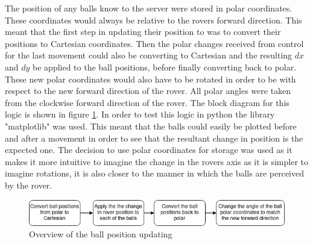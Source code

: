 \documentclass[10pt,twoside]{article}
\begin{document}
The position of any balls know to the server were stored in polar coordinates. These coordinates would always be relative to the rovers forward direction. This meant that the first step in updating their position to was to convert their positions to Cartesian coordinates. Then the polar changes received from control for the last movement could also be converting to Cartesian and the resulting $dx$ and $dy$ be applied to the ball positions, before finally converting back to polar. These new polar coordinates would also have to be rotated in order to be with respect to the new forward direction of the rover. All polar angles were taken from the clockwise forward direction of the rover. The block diagram for this logic is shown in figure \ref{fig:CommandBallPosition}. In order to test this logic in python the library "matplotlib" was used. This meant that the balls could easily be plotted before and after a movement in order to see that the resultant change in position is the expected one. The decision to use polar coordinates for storage was used as it makes it more intuitive to imagine the change in the rovers axis as it is simpler to imagine rotations, it is also closer to the manner in which the balls are perceived by the rover. 

\begin{figure}[hbt]
    \centering
    \includegraphics[scale = 0.6]{CommandBallPosition.jpg}
    \caption{Overview of the ball position updating}
    \label{fig:CommandBallPosition}
\end{figure}
\end{document}
